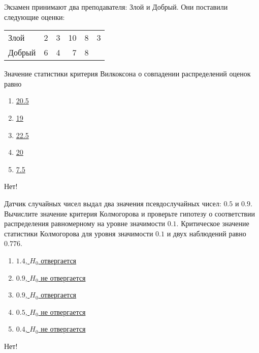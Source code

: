 \documentclass[t]{beamer}
\begin{document}
 \begin{frame} \label{28-No} 
\begin{block}{28} 

Экзамен принимают два преподавателя: Злой и Добрый. Они поставили следующие оценки:

\begin{center}
\begin{tabular}{lrrrrr} \toprule
Злой   & 2 & 3 & 10 & 8 & 3 \\
Добрый & 6 & 4 & 7  & 8 & \\
\bottomrule
\end{tabular}
\end{center}

Значение статистики критерия Вилкоксона о совпадении распределений оценок равно

  


 \end{block} 
\begin{enumerate} 
\item[] \hyperlink{28-No}{\beamergotobutton{} 20.5}
\item[] \hyperlink{28-No}{\beamergotobutton{} 19}
\item[] \hyperlink{28-Yes}{\beamergotobutton{} 22.5}
\item[] \hyperlink{28-No}{\beamergotobutton{} 20}
\item[] \hyperlink{28-No}{\beamergotobutton{} 7.5}
\end{enumerate} 

 \alert{Нет!} 
\end{frame} 


 \begin{frame} \label{29-No} 
\begin{block}{29} 

Датчик случайных чисел выдал два значения псевдослучайных чисел: $0.5$ и $0.9$. Вычислите значение критерия Колмогорова и проверьте гипотезу о соответствии распределения равномерному на уровне значимости $0.1$. Критическое значение статистики Колмогорова для уровня значимости $0.1$ и двух наблюдений равно $0.776$.
  


 \end{block} 
\begin{enumerate} 
\item[] \hyperlink{29-No}{\beamergotobutton{} $1.4$, $H_0$ отвергается}
\item[] \hyperlink{29-No}{\beamergotobutton{} $0.9$, $H_0$ не отвергается}
\item[] \hyperlink{29-No}{\beamergotobutton{} $0.9$, $H_0$ отвергается}
\item[] \hyperlink{29-Yes}{\beamergotobutton{} $0.5$, $H_0$ не отвергается}
\item[] \hyperlink{29-No}{\beamergotobutton{} $0.4$, $H_0$ не отвергается}
\end{enumerate} 

 \alert{Нет!} 
\end{frame} 
\end{document}
